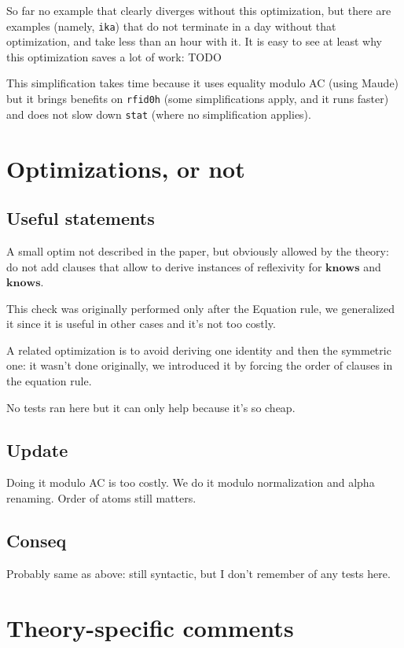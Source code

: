 \documentclass{article}
\newcommand{\mathcst}[1]{\mathrm{\textbf{#1}}}
\newcommand{\identical}{\mathcst{knows}}
\newcommand{\ridentical}{\mathcst{knows}}
\begin{document}
So far no example that clearly diverges without this optimization,
but there are examples (namely, \verb.ika.) that do not terminate in
a day without that optimization, and take less than an hour with it.
It is easy to see at least why this optimization saves a lot of work:
TODO

This simplification takes time because it uses equality modulo AC
(using Maude) but it brings benefits on \verb#rfid0h# (some
simplifications apply, and it runs faster) and does not slow down
\verb#stat# (where no simplification applies).

\section{Optimizations, or not} %

\subsection{Useful statements}

A small optim not described in the paper, but obviously allowed
by the theory: do not add clauses that allow to derive instances
of reflexivity for $\identical$ and $\ridentical$.

This check was originally performed only after the Equation rule,
we generalized it since it is useful in other cases and it's not
too costly.

A related optimization is to avoid deriving one identity and then
the symmetric one: it wasn't done originally, we introduced it
by forcing the order of clauses in the equation rule.

No tests ran here but it can only help because it's so cheap.

\subsection{Update}

Doing it modulo AC is too costly. We do it modulo normalization and
alpha renaming. Order of atoms still matters.

\subsection{Conseq}

Probably same as above: still syntactic,
but I don't remember of any tests here.

\section{Theory-specific comments} %
\end{document}
